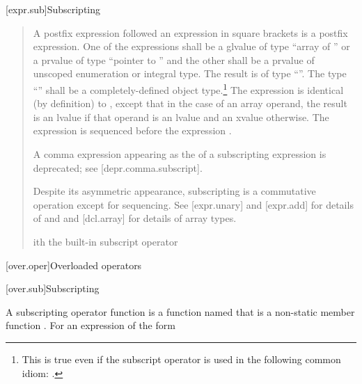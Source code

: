 \documentclass{wg21}
\begin{document}
[expr.sub]{Subscripting}
\begin{quote}
\pnum
{}%
%
A postfix expression followed an expression in square brackets is a
postfix expression. One of the expressions shall be a glvalue of type ``array of
'' or a prvalue of type ``pointer
to '' and the other shall be a prvalue of unscoped enumeration or integral type.
The result is of type ``''.
%
The type ``'' shall be a completely-defined object type.\footnote{This
    is true even if the subscript operator is used in the following common idiom:
    .}
The expression  is identical (by definition) to
,
except that in the case of an array operand, the result is an lvalue
if that operand is an lvalue and an xvalue otherwise.
The expression  is sequenced before the expression .

\pnum
\begin{removedblock}
\begin{note}
    A comma expression
    appearing as the 
    of a subscripting expression is deprecated;
    see [depr.comma.subscript].
\end{note}
\end{removedblock}

\pnum
\begin{note}
    Despite its asymmetric appearance, subscripting is a commutative
    operation except for sequencing.
    See [expr.unary] and [expr.add] for details of \tcode{*} and
    \tcode{+} and [dcl.array] for details of array types.
\end{note}

\pnum
{}ith the built-in subscript operator

\end{quote}


[over.oper]{Overloaded operators}%


[over.sub]{Subscripting}%
%

\pnum
A subscripting operator function
is a function named 
that is a non-static member function .
For an expression of the form
\end{document}
